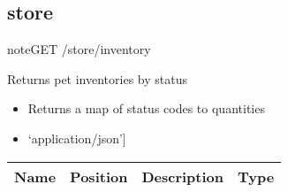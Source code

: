 \documentclass[letterpaper,10pt,english]{sphinxmanual}
\begin{document}
\subsection{store}
\label{\detokenize{dev-guide:store}}
\begin{sphinxadmonition}{note}{GET /store/inventory}

Returns pet inventories by status\begin{itemize}
\item {} 
Returns a map of status codes to quantities

\item {} 
\sphinxstylestrong{Produces: 
}{[}‘application/json’{]}

\end{itemize}




\begin{savenotes}\sphinxattablestart
\centering
\begin{tabulary}{\linewidth}[t]{|T|T|T|T|}
\hline
\sphinxstyletheadfamily 
Name
&\sphinxstyletheadfamily 
Position
&\sphinxstyletheadfamily 
Description
&\sphinxstyletheadfamily 
Type
\\
\hline
\end{tabulary}
\par
\sphinxattableend\end{savenotes}


\end{sphinxadmonition}
\end{document}
